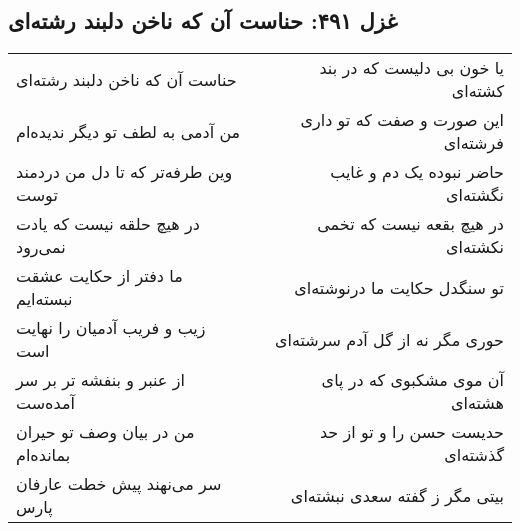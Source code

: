 \begin{center}
\section*{غزل ۴۹۱: حناست آن که ناخن دلبند رشته‌ای}
\label{sec:491}
\begin{longtable}{l p{0.5cm} r}
حناست آن که ناخن دلبند رشته‌ای
&&
یا خون بی دلیست که در بند کشته‌ای
\\
من آدمی به لطف تو دیگر ندیده‌ام
&&
این صورت و صفت که تو داری فرشته‌ای
\\
وین طرفه‌تر که تا دل من دردمند توست
&&
حاضر نبوده یک دم و غایب نگشته‌ای
\\
در هیچ حلقه نیست که یادت نمی‌رود
&&
در هیچ بقعه نیست که تخمی نکشته‌ای
\\
ما دفتر از حکایت عشقت نبسته‌ایم
&&
تو سنگدل حکایت ما درنوشته‌ای
\\
زیب و فریب آدمیان را نهایت است
&&
حوری مگر نه از گل آدم سرشته‌ای
\\
از عنبر و بنفشه تر بر سر آمده‌ست
&&
آن موی مشکبوی که در پای هشته‌ای
\\
من در بیان وصف تو حیران بمانده‌ام
&&
حدیست حسن را و تو از حد گذشته‌ای
\\
سر می‌نهند پیش خطت عارفان پارس
&&
بیتی مگر ز گفته سعدی نبشته‌ای
\\
\end{longtable}
\end{center}
